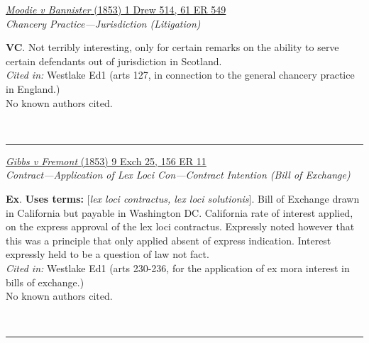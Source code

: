 \documentclass[twoside]{article}
\begin{document}
        \begin{small}
        \begin{center}
        \href{https://heinonline.org/HOL/P?h=hein.engrep/engre0061&i=557}{\textit{Moodie v Bannister} (1853) 1 Drew 514, 61 ER 549} \label{108} \\ 
\textit{Chancery Practice---Jurisdiction (Litigation)}\\
        \end{center}
        \textbf{VC}. Not terribly interesting, only for certain remarks on the ability to serve certain defendants out of jurisdiction in Scotland.\\\textit{Cited in: }Westlake Ed1 (arts 127, in connection to the general chancery practice in England.)\\No known authors cited.
        \end{small}\\
        \rule{\textwidth}{0.5pt}
        

        \begin{small}
        \begin{center}
        \href{https://heinonline.org/HOL/P?h=hein.engrep/engrh0156&i=15}{\textit{Gibbs v Fremont} (1853) 9 Exch 25, 156 ER 11} \label{113} \\ 
\textit{Contract---Application of Lex Loci Con---Contract Intention (Bill of Exchange)}\\
        \end{center}
        \textbf{Ex}.  \textbf{Uses terms: }[\textit{lex loci contractus, lex loci solutionis}]. Bill of Exchange drawn in California but payable in Washington DC. California rate of interest applied, on the express approval of the lex loci contractus. Expressly noted however that this was a principle that only applied absent of express indication. Interest expressly held to be a question of law not fact.\\\textit{Cited in: }Westlake Ed1 (arts 230-236, for the application of ex mora interest in bills of exchange.)\\No known authors cited.
        \end{small}\\
        \rule{\textwidth}{0.5pt}
        
\end{document}
